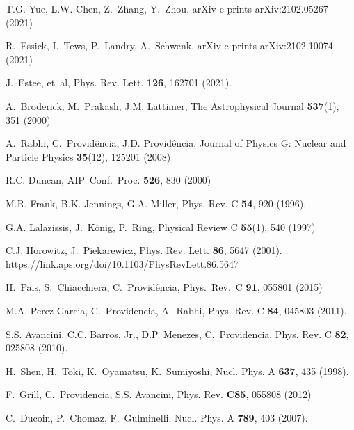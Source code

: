 \documentclass[epj]{svjour}
\begin{document}
\begin{thebibliography}{10}
T.G. {Yue}, L.W. {Chen}, Z.~{Zhang}, Y.~{Zhou}, arXiv e-prints arXiv:2102.05267
  (2021)

R.~{Essick}, I.~{Tews}, P.~{Landry}, A.~{Schwenk}, arXiv e-prints
  arXiv:2102.10074 (2021)

J.~Estee, et~al, Phys. Rev. Lett. \textbf{126}, 162701 (2021).
\newblock {}

A.~Broderick, M.~Prakash, J.M. Lattimer, The Astrophysical Journal
  \textbf{537}(1), 351 (2000)

A.~Rabhi, C.~Provid{\^{e}}ncia, J.D. Provid{\^{e}}ncia, Journal of Physics G:
  Nuclear and Particle Physics \textbf{35}(12), 125201 (2008)

R.C. Duncan, AIP\ Conf.\ Proc. \textbf{526}, 830 (2000)

M.R. Frank, B.K. Jennings, G.A. Miller, Phys. Rev. C \textbf{54}, 920 (1996).
\newblock {}

G.A. Lalazissis, J.~K\"{o}nig, P.~Ring, Physical Review C \textbf{55}(1), 540
  (1997)

C.J. Horowitz, J.~Piekarewicz, Phys. Rev. Lett. \textbf{86}, 5647 (2001).
\newblock {}.
\newblock \urlprefix\url{https://link.aps.org/doi/10.1103/PhysRevLett.86.5647}

H.~Pais, S.~Chiacchiera, C.~Provid\^encia, Phys.\ Rev.\ C \textbf{91}, 055801
  (2015)

M.A. Perez-Garcia, C.~Providencia, A.~Rabhi, Phys. Rev. C \textbf{84}, 045803
  (2011).
\newblock {}

S.S. Avancini, C.C. Barros, Jr., D.P. Menezes, C.~Providencia, Phys. Rev. C
  \textbf{82}, 025808 (2010).
\newblock {}

H.~Shen, H.~Toki, K.~Oyamatsu, K.~Sumiyoshi, Nucl. Phys. A \textbf{637}, 435
  (1998).
\newblock {}

F.~Grill, C.~Providencia, S.S. Avancini, Phys. Rev. \textbf{C85}, 055808 (2012)

C.~Ducoin, P.~Chomaz, F.~Gulminelli, Nucl. Phys. A \textbf{789}, 403 (2007).
\newblock {}


\end{thebibliography}
\end{document}
